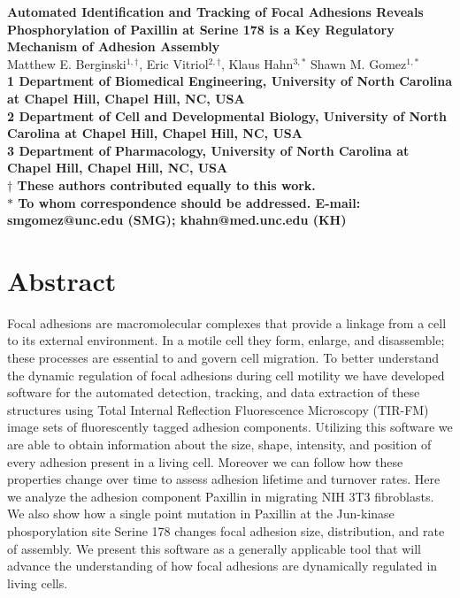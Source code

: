 \documentclass[10pt,draft]{article}
\date{}
\begin{document}
\begin{flushleft}
{\Large
\textbf{Automated Identification and Tracking of Focal Adhesions Reveals Phosphorylation of Paxillin at Serine 178 is a Key Regulatory Mechanism of Adhesion Assembly}
}
\\
Matthew E. Berginski$^{1,\dagger}$, 
Eric Vitriol$^{2,\dagger}$, 
Klaus Hahn$^{3,\ast}$
Shawn M. Gomez$^{1,\ast}$
\\
\bf{1} Department of Biomedical Engineering, University of North Carolina at Chapel Hill, Chapel Hill, NC, USA
\\
\bf{2} Department of Cell and Developmental Biology, University of North Carolina at Chapel Hill, Chapel Hill, NC, USA
\\
\bf{3} Department of Pharmacology, University of North Carolina at Chapel Hill, Chapel Hill, NC, USA
\\
$\dagger$ These authors contributed equally to this work.
\\
$\ast$ To whom correspondence should be addressed. E-mail: smgomez@unc.edu (SMG); khahn@med.unc.edu (KH)
\end{flushleft}

\section*{Abstract}

Focal adhesions are macromolecular complexes that provide a linkage from a cell to its external environment. In a motile cell they form, enlarge, and disassemble; these processes are essential to and govern cell migration. To better understand the dynamic regulation of focal adhesions during cell motility we have developed software for the automated detection, tracking, and data extraction of these structures using Total Internal Reflection Fluorescence Microscopy (TIR-FM) image sets of fluorescently tagged adhesion components. Utilizing this software we are able to obtain information about the size, shape, intensity, and position of every adhesion present in a living cell. Moreover we can follow how these properties change over time to assess adhesion lifetime and turnover rates. Here we analyze the adhesion component Paxillin in migrating NIH 3T3 fibroblasts. We also show how a single point mutation in Paxillin at the Jun-kinase phosporylation site Serine 178 changes focal adhesion size, distribution, and rate of assembly. We present this software as a generally applicable tool that will advance the understanding of how focal adhesions are dynamically regulated in living cells.
\end{document}
